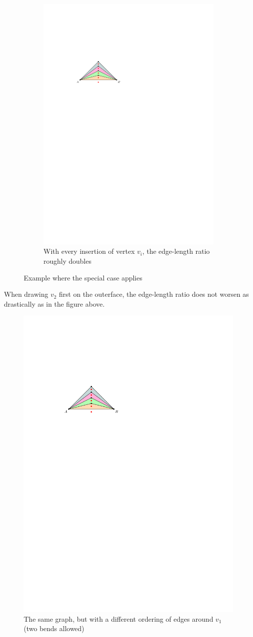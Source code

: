 \begin{figure}[H]
\begin{subfigure}{0.7\textwidth}
	\centering
	\includegraphics[width=.7\linewidth,page=17]{drawings/k-trees.pdf}
	\caption{With every insertion of vertex $v_i$, the edge-length ratio roughly doubles}
\end{subfigure}
\caption{Example where the special case applies}
\label{im:v16r-rfirst}
\end{figure}
\begin{observation}
	When drawing $v_2$ first on the outerface, the edge-length ratio does not worsen as drastically as in the figure above.
\end{observation}
\begin{figure}[H]
	\centering
	\includegraphics[width=.4\linewidth,page=18]{drawings/k-trees.pdf}
	\caption{The same graph, but with a different ordering of edges around $v_1$  (two bends allowed)}
	\label{im:ABCv16+r}
\end{figure}

